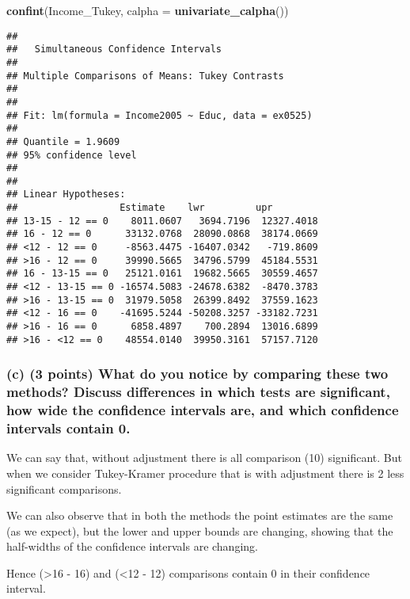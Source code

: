 \documentclass[]{article}
\newenvironment{Shaded}{\begin{snugshade}}{\end{snugshade}}
\newcommand{\KeywordTok}[1]{\textcolor[rgb]{0.13,0.29,0.53}{\textbf{#1}}}
\newcommand{\DataTypeTok}[1]{\textcolor[rgb]{0.13,0.29,0.53}{#1}}
\newcommand{\NormalTok}[1]{#1}
\begin{document}
\begin{Shaded}
\begin{Highlighting}[]
\KeywordTok{confint}\NormalTok{(Income_Tukey, }\DataTypeTok{calpha =} \KeywordTok{univariate_calpha}\NormalTok{())}
\end{Highlighting}
\end{Shaded}

\begin{verbatim}
## 
##   Simultaneous Confidence Intervals
## 
## Multiple Comparisons of Means: Tukey Contrasts
## 
## 
## Fit: lm(formula = Income2005 ~ Educ, data = ex0525)
## 
## Quantile = 1.9609
## 95% confidence level
##  
## 
## Linear Hypotheses:
##                  Estimate    lwr         upr        
## 13-15 - 12 == 0    8011.0607   3694.7196  12327.4018
## 16 - 12 == 0      33132.0768  28090.0868  38174.0669
## <12 - 12 == 0     -8563.4475 -16407.0342   -719.8609
## >16 - 12 == 0     39990.5665  34796.5799  45184.5531
## 16 - 13-15 == 0   25121.0161  19682.5665  30559.4657
## <12 - 13-15 == 0 -16574.5083 -24678.6382  -8470.3783
## >16 - 13-15 == 0  31979.5058  26399.8492  37559.1623
## <12 - 16 == 0    -41695.5244 -50208.3257 -33182.7231
## >16 - 16 == 0      6858.4897    700.2894  13016.6899
## >16 - <12 == 0    48554.0140  39950.3161  57157.7120
\end{verbatim}

\subsubsection{(c) (3 points) What do you notice by comparing these two
methods? Discuss differences in which tests are significant, how wide
the confidence intervals are, and which confidence intervals contain
0.}\label{c-3-points-what-do-you-notice-by-comparing-these-two-methods-discuss-differences-in-which-tests-are-significant-how-wide-the-confidence-intervals-are-and-which-confidence-intervals-contain-0.}

We can say that, without adjustment there is all comparison (10)
significant. But when we consider Tukey-Kramer procedure that is with
adjustment there is 2 less significant comparisons.

We can also observe that in both the methods the point estimates are the
same (as we expect), but the lower and upper bounds are changing,
showing that the half-widths of the confidence intervals are changing.

Hence (\textgreater{}16 - 16) and (\textless{}12 - 12) comparisons
contain 0 in their confidence interval.
\end{document}

